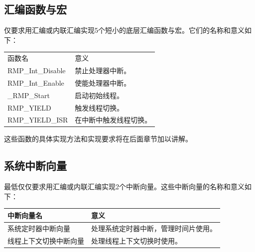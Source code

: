 \subsection{汇编函数与宏}\label{subsec:assembly-functions-and-macros}

仅要求用汇编或内联汇编实现5个短小的底层汇编函数与宏。它们的名称和意义如下：

\label{tab:overview-of-assembly-functions-and-macros}

{\def\LTcaptype{none} %
\begin{longtable}[]{@{}
  >{\raggedright\arraybackslash}p{}
  >{\raggedright\arraybackslash}p{}@{}}
\toprule\noalign{}
\endhead
\bottomrule\noalign{}
\endlastfoot
函数名 & 意义 \\
RMP\_Int\_Disable & 禁止处理器中断。 \\
RMP\_Int\_Enable & 使能处理器中断。 \\
\_RMP\_Start & 启动初始线程。 \\
RMP\_YIELD & 触发线程切换。 \\
RMP\_YIELD\_ISR & 在中断中触发线程切换。 \\
\end{longtable}
}

这些函数的具体实现方法和实现要求将在后面章节加以讲解。

\subsection{系统中断向量}\label{subsec:system-interrupt-vectors}

最低仅仅要求用汇编或内联汇编实现2个中断向量。这些中断向量的名称和意义如下：

\label{tab:overview-of-system-interrupt-vectors}

{\def\LTcaptype{none} %
\begin{longtable}[]{@{}
  >{\raggedright\arraybackslash}p{}
  >{\raggedright\arraybackslash}p{}@{}}
\toprule\noalign{}
\begin{minipage}[b]{\linewidth}\raggedright
中断向量名
\end{minipage} & \begin{minipage}[b]{\linewidth}\raggedright
意义
\end{minipage} \\
\midrule\noalign{}
\endhead
\bottomrule\noalign{}
\endlastfoot
系统定时器中断向量 & 处理系统定时器中断，管理时间片使用。 \\
线程上下文切换中断向量 & 处理线程上下文切换时使用。 \\
\end{longtable}
}

